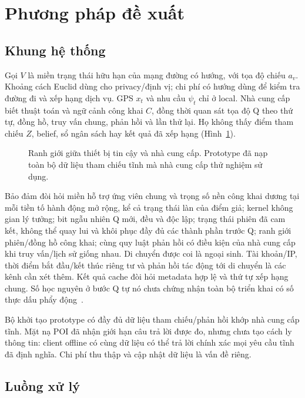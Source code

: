 \section{Phương pháp đề xuất}\label{sec:method}
\subsection{Khung hệ thống}\label{sec:system}
Gọi $V$ là miền trạng thái hữu hạn của mạng đường có hướng, với tọa độ chiếu
$a_v$. Khoảng cách Euclid dùng cho privacy/định vị; chi phí có hướng dùng để
kiểm tra đường đi và xếp hạng dịch vụ. GPS $x_t$ và nhu cầu $\psi_t$ chỉ ở local.
Nhà cung cấp biết thuật toán và ngữ cảnh công khai $C$, đồng thời quan sát
tọa độ Q theo thứ tự, đồng hồ, truy vấn chung, phản hồi và lần thử lại.
Họ không thấy điểm tham chiếu $Z$, belief, sổ ngân sách hay kết quả đã xếp hạng
(Hình~\ref{fig:system}).

\begin{figure}[!ht]\centering
\resizebox{\columnwidth}{!}{}
\caption{Ranh giới giữa thiết bị tin cậy và nhà cung cấp. Prototype đã nạp toàn
bộ dữ liệu tham chiếu tĩnh mà nhà cung cấp thử nghiệm sử dụng.}\label{fig:system}
\end{figure}

Bảo đảm đòi hỏi miền hỗ trợ ứng viên chung và trọng số nền công khai dương
tại mỗi tiền tố hành động mở rộng, kể cả trạng thái làn của điểm giả; kernel
không gian lý tưởng; bit ngẫu nhiên Q mới, đều và độc lập; trạng thái phiên
đã cam kết, không thể quay lui và khôi phục đầy đủ các thành phần trước Q;
ranh giới phiên/đồng hồ công khai; cùng quy luật phản hồi có điều kiện của
nhà cung cấp khi truy vấn/lịch sử giống nhau. Di chuyển được coi là ngoại sinh.
Tài khoản/IP, thời điểm bắt đầu/kết thúc riêng tư và phản hồi tác động tới
di chuyển là các kênh cần xét thêm. Kết quả cache đòi hỏi metadata hợp lệ và
thứ tự xếp hạng chung. Số học nguyên ở bước Q tự nó chưa chứng nhận toàn bộ
triển khai có số thực dấu phẩy động~\cite{mironov}.

Bộ khởi tạo prototype có đầy đủ dữ liệu tham chiếu/phản hồi khớp nhà cung cấp
tĩnh. Mặt nạ POI đã nhận giới hạn câu trả lời được đo, nhưng chưa tạo cách ly
thông tin: client offline có cùng dữ liệu có thể trả lời chính xác mọi yêu
cầu tĩnh đã định nghĩa. Chi phí thu thập và cập nhật dữ liệu là vấn đề riêng.

\subsection{Luồng xử lý}
